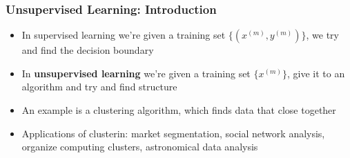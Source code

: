 \subsubsection{Unsupervised Learning: Introduction}
\begin{itemize}[--]
	\item In supervised learning we're given a training set $\{(x^{(m)}, y^{(m)})\}$, we try and find the decision boundary
	\item In \textbf{unsupervised learning} we're given a training set $\{x^{(m)}\}$, give it to an algorithm and try and find structure
	\item An example is a clustering algorithm, which finds data that close together
	\item Applications of clusterin: market segmentation, social network analysis, organize computing clusters, astronomical data analysis
\end{itemize}

